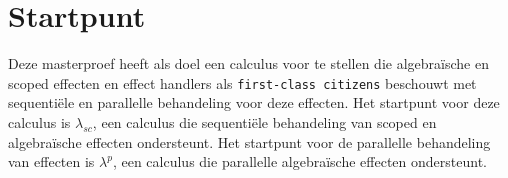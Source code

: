 \chapter{Startpunt}


\label{hoofdstuk:startpunt}
Deze masterproef heeft als doel een calculus voor te stellen die algebraïsche en scoped effecten en effect handlers als \texttt{first-class citizens} beschouwt met sequentiële en parallelle behandeling voor deze effecten. Het startpunt voor deze calculus is $\lambda_{sc}$\cite{Bosman2022}, een calculus die sequentiële behandeling van scoped en algebraïsche effecten ondersteunt. Het startpunt voor de parallelle behandeling van effecten is $\lambda^{p}$\cite{Xie2021}, een calculus die parallelle algebraïsche effecten ondersteunt.


